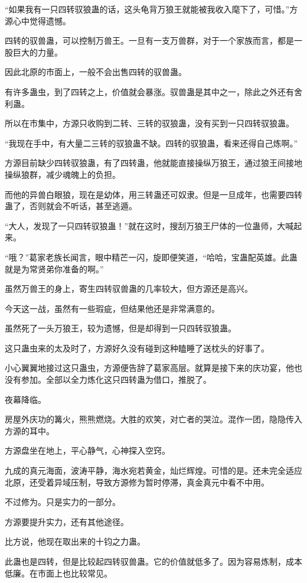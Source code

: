 \begin{this_body}
“如果我有一只四转驭狼蛊的话，这头龟背万狼王就能被我收入麾下了，可惜。”方源心中觉得遗憾。

四转的驭兽蛊，可以控制万兽王。一旦有一支万兽群，对于一个家族而言，都是一股巨大的力量。

因此北原的市面上，一般不会出售四转的驭兽蛊。

有许多蛊虫，到了四转之上，价值就会暴涨。驭兽蛊是其中之一，除此之外还有舍利蛊。

所以在市集中，方源只收购到二转、三转的驭狼蛊，没有买到一只四转驭狼蛊。

“我现在手中，有大量二三转的驭狼蛊不缺。四转的驭狼蛊，看来还得自己炼啊。”

方源目前缺少四转驭狼蛊，有了四转蛊，他就能直接操纵万狼王，通过狼王间接地操纵狼群，减少魂魄上的负担。

而他的异兽白眼狼，现在是幼体，用三转蛊还可奴隶。但是一旦成年，也需要四转蛊了，否则就会不听话，甚至逃遁。

“大人，发现了一只四转驭狼蛊！”就在这时，搜刮万狼王尸体的一位蛊师，大喊起来。

“哦？”葛家老族长闻言，眼中精芒一闪，旋即便笑道，“哈哈，宝蛊配英雄。此蛊就是为常贤弟你准备的啊。”

虽然万兽王的身上，寄生四转驭兽蛊的几率较大，但方源还是高兴。

今天这一战，虽然有一些瑕疵，但结果他还是非常满意的。

虽然死了一头万狼王，较为遗憾，但是却得到一只四转驭狼蛊。

这只蛊虫来的太及时了，方源好久没有碰到这种瞌睡了送枕头的好事了。

小心翼翼地接过这只蛊虫，方源便告辞了葛家高层。就算是接下来的庆功宴，他也没有参加。全部以全力炼化这只四转蛊为借口，推脱了。

夜幕降临。

房屋外庆功的篝火，熊熊燃烧。大胜的欢笑，对亡者的哭泣。混作一团，隐隐传入方源的耳中。

方源盘坐在地上，平心静气，心神探入空窍。

九成的真元海面，波涛平静，海水宛若黄金，灿烂辉煌。可惜的是。还未完全适应北原，还受着异域压制，导致方源修为暂时停滞，真金真元中看不中用。

不过修为。只是实力的一部分。

方源要提升实力，还有其他途径。

比方说，他现在取出来的十钧之力蛊。

此蛊也是四转，但是比较起四转驭兽蛊。它的价值就低多了。因为容易炼制，成本低廉。在市面上也比较常见。


\end{this_body}
